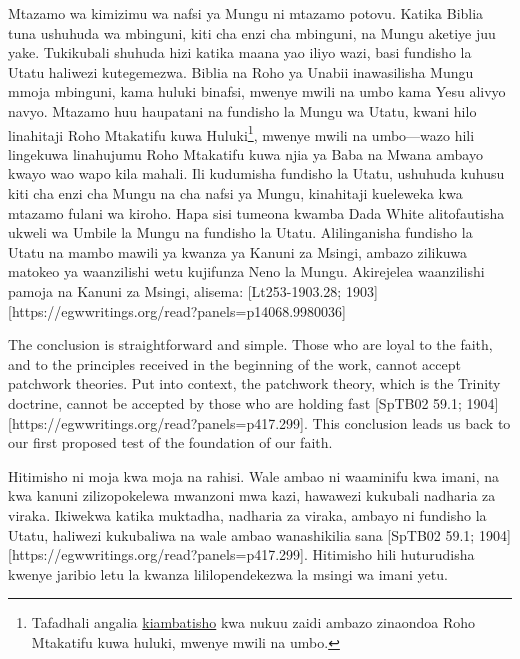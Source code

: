 Mtazamo wa kimizimu wa nafsi ya Mungu ni mtazamo potovu. Katika Biblia tuna ushuhuda wa mbinguni, kiti cha enzi cha mbinguni, na Mungu aketiye juu yake. Tukikubali shuhuda hizi katika maana yao iliyo wazi, basi fundisho la Utatu haliwezi kutegemezwa. Biblia na Roho ya Unabii inawasilisha Mungu mmoja mbinguni, kama huluki binafsi, mwenye mwili na umbo kama Yesu alivyo navyo. Mtazamo huu haupatani na fundisho la Mungu wa Utatu, kwani hilo linahitaji Roho Mtakatifu kuwa Huluki\footnote{Tafadhali angalia \hyperref[appendix:unauthenticated-reports]{kiambatisho} kwa nukuu zaidi ambazo zinaondoa Roho Mtakatifu kuwa huluki, mwenye mwili na umbo.}, mwenye mwili na umbo—wazo hili lingekuwa linahujumu Roho Mtakatifu kuwa njia ya Baba na Mwana ambayo kwayo wao wapo kila mahali. Ili kudumisha fundisho la Utatu, ushuhuda kuhusu kiti cha enzi cha Mungu na cha nafsi ya Mungu, kinahitaji kueleweka kwa mtazamo fulani wa kiroho. Hapa sisi tumeona kwamba Dada White alitofautisha ukweli wa Umbile la Mungu na fundisho la Utatu. Alilinganisha fundisho la Utatu na mambo mawili ya kwanza ya Kanuni za Msingi, ambazo zilikuwa matokeo ya waanzilishi wetu kujifunza Neno la Mungu. Akirejelea waanzilishi pamoja na Kanuni za Msingi, alisema: [Lt253-1903.28; 1903][https://egwwritings.org/read?panels=p14068.9980036]


The conclusion is straightforward and simple. Those who are loyal to the faith, and to the principles received in the beginning of the work, cannot accept patchwork theories. Put into context, the patchwork theory, which is the Trinity doctrine, cannot be accepted by those who are holding fast [SpTB02 59.1; 1904][https://egwwritings.org/read?panels=p417.299]. This conclusion leads us back to our first proposed test of the foundation of our faith.


Hitimisho ni moja kwa moja na rahisi. Wale ambao ni waaminifu kwa imani, na kwa kanuni zilizopokelewa mwanzoni mwa kazi, hawawezi kukubali nadharia za viraka. Ikiwekwa katika muktadha, nadharia za viraka, ambayo ni fundisho la Utatu, haliwezi kukubaliwa na wale ambao wanashikilia sana [SpTB02 59.1; 1904][https://egwwritings.org/read?panels=p417.299]. Hitimisho hili huturudisha kwenye jaribio letu la kwanza lililopendekezwa la msingi wa imani yetu.


